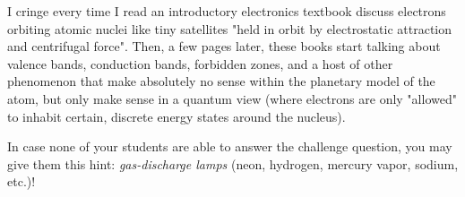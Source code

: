 I cringe every time I read an introductory electronics textbook discuss electrons orbiting atomic nuclei like tiny satellites "held in orbit by electrostatic attraction and centrifugal force".  Then, a few pages later, these books start talking about valence bands, conduction bands, forbidden zones, and a host of other phenomenon that make absolutely no sense within the planetary model of the atom, but only make sense in a quantum view (where electrons are only "allowed" to inhabit certain, discrete energy states around the nucleus).

In case none of your students are able to answer the challenge question, you may give them this hint: {\it gas-discharge lamps} (neon, hydrogen, mercury vapor, sodium, etc.)!




